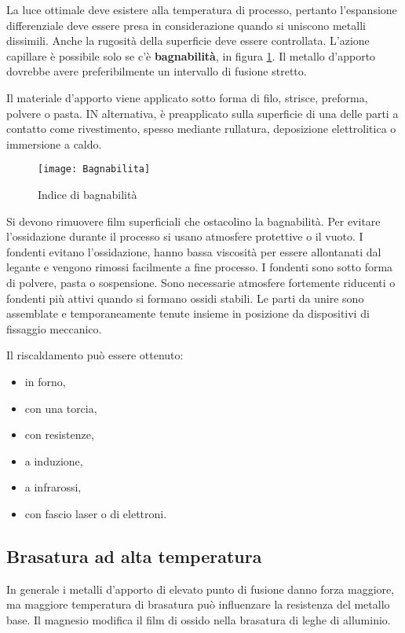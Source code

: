 La luce ottimale deve esistere alla temperatura di processo, pertanto l'espansione differenziale deve essere presa in considerazione quando si uniscono metalli dissimili.
Anche la rugosità della superficie deve essere controllata.
L'azione capillare è possibile solo se c'è \textbf{bagnabilità}, in figura \ref{fig:Bagnabilita}.
Il metallo d'apporto dovrebbe avere preferibilmente un intervallo di fusione stretto.

Il materiale d'apporto viene applicato sotto forma di filo, strisce, preforma, polvere o pasta.
IN alternativa, è preapplicato sulla superficie di una delle parti a contatto come rivestimento, spesso mediante rullatura, deposizione elettrolitica o immersione a caldo.

\begin{figure}
\centering
\texttt{[image: Bagnabilita]}
\caption{Indice di bagnabilità}
\label{fig:Bagnabilita}
\end{figure}

Si devono rimuovere film superficiali che ostacolino la bagnabilità.
Per evitare l'ossidazione durante il processo si usano atmosfere protettive o il vuoto.
I fondenti evitano l'ossidazione, hanno bassa viscosità per essere allontanati dal legante e vengono rimossi facilmente a fine processo.
I fondenti sono sotto forma di polvere, pasta o sospensione.
Sono necessarie atmosfere fortemente riducenti o fondenti più attivi quando si formano ossidi stabili.
Le parti da unire sono assemblate e temporaneamente tenute insieme in posizione da dispositivi di fissaggio meccanico.

Il riscaldamento può essere ottenuto:
\begin{itemize}
\item in forno,
\item con una torcia,
\item con resistenze,
\item a induzione,
\item a infrarossi,
\item con fascio laser o di elettroni.
\end{itemize}

\subsection{Brasatura ad alta temperatura}
In generale i metalli d'apporto di elevato punto di fusione danno forza maggiore, ma maggiore temperatura di brasatura può influenzare la resistenza del metallo base.
Il magnesio modifica il film di ossido nella brasatura di leghe di alluminio.

